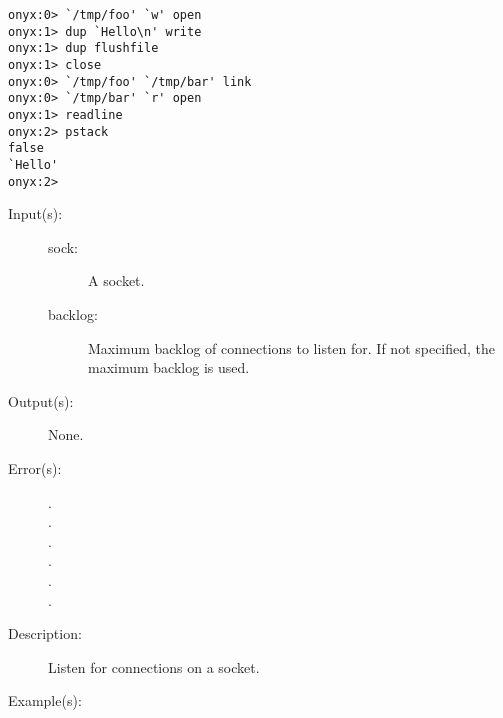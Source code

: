 \begin{description}
\begin{description}
\begin{verbatim}
onyx:0> `/tmp/foo' `w' open
onyx:1> dup `Hello\n' write
onyx:1> dup flushfile
onyx:1> close
onyx:0> `/tmp/foo' `/tmp/bar' link
onyx:0> `/tmp/bar' `r' open
onyx:1> readline
onyx:2> pstack
false
`Hello'
onyx:2>
		\end{verbatim}
	\end{description}
\label{systemdict:listen}
\item[{\onyxop{sock backlog}{listen}{--}}: ]
\item[{\onyxop{sock}{listen}{--}}: ]
	\begin{description}\item[]
	\item[Input(s): ]
		\begin{description}\item[]
		\item[sock: ]
			A socket.
		\item[backlog: ]
			Maximum backlog of connections to listen for.  If not
			specified, the maximum backlog is used.
		\end{description}
	\item[Output(s): ] None.
	\item[Error(s): ]
		\begin{description}\item[]
		\item[.]
		\item[.]
		\item[.]
		\item[.]
		\item[.]
		\item[.]
		\end{description}
	\item[Description: ]
		Listen for connections on a socket.
	\item[Example(s): ]\begin{verbatim}


\end{verbatim}
\end{description}
\end{description}
